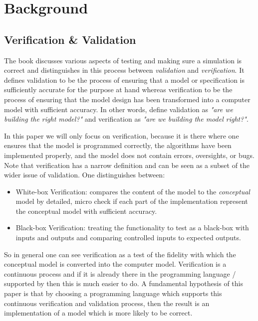 \section{Background}
\subsection{Verification \& Validation}
The book \cite{robinson_simulation:_2014} discusses various aspects of testing and making sure a simulation is correct and distinguishes in this process between \textit{validation} and \textit{verification}. It defines validation to be the process of ensuring that a model or specification is sufficiently accurate for the purpose at hand whereas verification to be the process of ensuring that the model design has been transformed into a computer model with sufficient accuracy. In other words, \cite{balci_verification_1998} define validation as \textit{"are we building the right model?"} and verification as \textit{"are we building the model right?"}.

In this paper we will only focus on verification, because it is there where one ensures that the model is programmed correctly, the algorithms have been implemented properly, and the model does not contain errors, oversights, or bugs. Note that verification has a narrow definition and can be seen as a subset of the wider issue of validation. One distinguishes between:

\begin{itemize}
	\item White-box Verification: compares the content of the model to the \textit{conceptual} model by detailed, micro check if each part of the implementation represent the conceptual model with sufficient accuracy. 
	\item Black-box Verification: treating the functionality to test as a black-box with inputs and outputs and comparing controlled inputs to expected outputs.
\end{itemize}

So in general one can see verification as a test of the fidelity with which the conceptual model is converted into the computer model. Verification is a continuous process and if it is already there in the programming language / supported by then this is much easier to do. A fundamental hypothesis of this paper is that by choosing a programming language which supports this continuous verification and validation process, then the result is an implementation of a model which is more likely to be correct.

